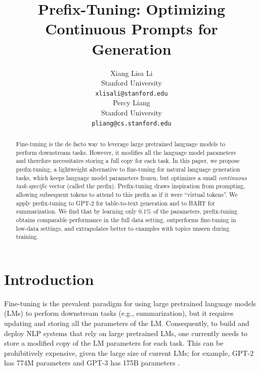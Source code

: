 \documentclass[11pt,a4paper]{article}
\title{Prefix-Tuning: Optimizing Continuous Prompts for Generation}
\author{Xiang Lisa Li \\
  Stanford University \\
  \texttt{xlisali@stanford.edu} \\\And
  Percy Liang \\
  Stanford University \\
  \texttt{pliang@cs.stanford.edu} \\}
\date{}
\newcommand\pl[1]{\textcolor{red}{[PL: #1]}}
\newcommand\lisa[1]{\textcolor{blue}{[Lisa: #1]}}
\begin{document}
\maketitle
\begin{abstract}
Fine-tuning is the de facto way to leverage large pretrained language models to perform downstream tasks. 
However, it modifies all the language model parameters and therefore necessitates storing a full copy for each task.
In this paper, we propose prefix-tuning, a lightweight alternative to fine-tuning for natural language generation tasks, which keeps language model parameters frozen, but optimizes a small \emph{continuous task-specific} vector (called the prefix). 
Prefix-tuning draws inspiration from prompting, allowing subsequent tokens to attend to this prefix as if it were ``virtual tokens''. 
We apply prefix-tuning to GPT-2 for table-to-text generation and to BART for summarization. 
We find that by learning only 0.1\% of the parameters, prefix-tuning obtains comparable performance in the full data setting, outperforms fine-tuning in low-data settings, and extrapolates better to examples with topics unseen during training.
\end{abstract}

\section{Introduction}
\label{sec:intro}


Fine-tuning is the prevalent paradigm for using large pretrained language models (LMs) \cite{Radford2019gpt2,devlin-etal-2019-bert} to perform downstream tasks (e.g., summarization), but it requires updating and storing all the parameters of the LM. 
Consequently, to build and deploy NLP systems that rely on large pretrained LMs, one currently needs to store a modified copy of the LM parameters for each task.  This can be prohibitively expensive, given the large size of current LMs; for example, GPT-2 has 774M parameters \cite{Radford2019gpt2} and GPT-3 has 175B parameters \cite{brown2020language}. 
\end{document}

